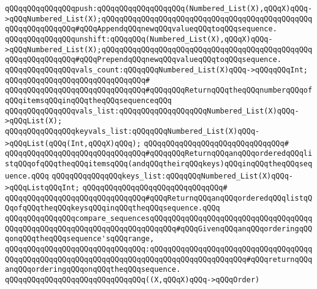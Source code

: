 \verb|qQQqqQQqqQQqqQQqpush:qQQqqQQqqQQqqQQqqQQq(Numbered_List(X),qQQqX)qQQq->qQQqNumbered_List(X);qQQqqQQqqQQqqQQqqQQqqQQqqQQqqQQqqQQqqQQqqQQqqQQqqQQqqQQqqQQqqQQq#qQQqAppendqQQqnewqQQqvalueqQQqtoqQQqsequence.|\newline
\verb|qQQqqQQqqQQqqQQqunshift:qQQqqQQq(Numbered_List(X),qQQqX)qQQq->qQQqNumbered_List(X);qQQqqQQqqQQqqQQqqQQqqQQqqQQqqQQqqQQqqQQqqQQqqQQqqQQqqQQqqQQqqQQq#qQQqPrependqQQqnewqQQqvalueqQQqtoqQQqsequence.|\newline
\newline
\verb|qQQqqQQqqQQqqQQqvals_count:qQQqqQQqNumbered_List(X)qQQq->qQQqqQQqInt;|\newline
\verb|qQQqqQQqqQQqqQQqqQQqqQQqqQQqqQQq#|\newline
\verb|qQQqqQQqqQQqqQQqqQQqqQQqqQQqqQQq#qQQqqQQqReturnqQQqtheqQQqnumberqQQqofqQQqitemsqQQqinqQQqtheqQQqsequenceqQQq|\newline
\newline
\verb|qQQqqQQqqQQqqQQqvals_list:qQQqqQQqqQQqqQQqqQQqNumbered_List(X)qQQq->qQQqList(X);|\newline
\newline
\verb|qQQqqQQqqQQqqQQqkeyvals_list:qQQqqQQqNumbered_List(X)qQQq->qQQqList(qQQq(Int,qQQqX)qQQq);|\newline
\verb|qQQqqQQqqQQqqQQqqQQqqQQqqQQqqQQq#|\newline
\verb|qQQqqQQqqQQqqQQqqQQqqQQqqQQqqQQq#qQQqqQQqReturnqQQqanqQQqorderedqQQqlistqQQqofqQQqtheqQQqitemsqQQq(andqQQqtheirqQQqkeys)qQQqinqQQqtheqQQqsequence.qQQq|\newline
\newline
\verb|qQQqqQQqqQQqqQQqkeys_list:qQQqqQQqNumbered_List(X)qQQq->qQQqListqQQqInt;|\newline
\verb|qQQqqQQqqQQqqQQqqQQqqQQqqQQqqQQq#|\newline
\verb|qQQqqQQqqQQqqQQqqQQqqQQqqQQqqQQq#qQQqReturnqQQqanqQQqorderedqQQqlistqQQqofqQQqtheqQQqkeysqQQqinqQQqtheqQQqsequence.qQQq|\newline
\newline
\verb|qQQqqQQqqQQqqQQqcompare_sequencesqQQqqQQqqQQqqQQqqQQqqQQqqQQqqQQqqQQqqQQqqQQqqQQqqQQqqQQqqQQqqQQqqQQqqQQqqQQq#qQQqGivenqQQqanqQQqorderingqQQqonqQQqtheqQQqsequence'sqQQqrange,|\newline
\verb|qQQqqQQqqQQqqQQqqQQqqQQqqQQqqQQq:qQQqqQQqqQQqqQQqqQQqqQQqqQQqqQQqqQQqqQQqqQQqqQQqqQQqqQQqqQQqqQQqqQQqqQQqqQQqqQQqqQQqqQQqqQQq#qQQqreturnqQQqanqQQqorderingqQQqonqQQqtheqQQqsequence.|\newline
\verb|qQQqqQQqqQQqqQQqqQQqqQQqqQQqqQQq((X,qQQqX)qQQq->qQQqOrder)|\newline
